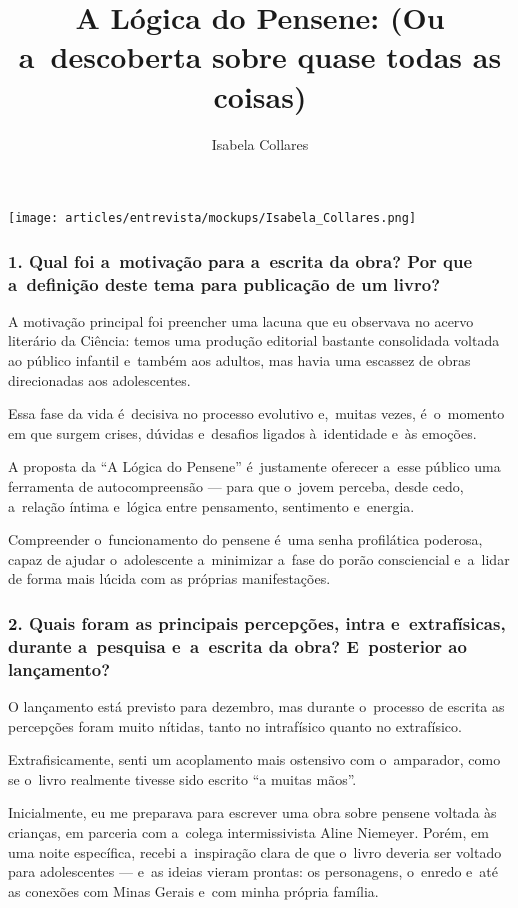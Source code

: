 \documentclass{gescons}
\author{Isabela Collares}
\title{A Lógica do Pensene: (Ou a~descoberta sobre quase todas as coisas)}
\begin{document}
    \makeentrevistatitle

    \begin{multicols}{3}

\begin{center}
    \texttt{[image: articles/entrevista/mockups/Isabela\_Collares.png]}
\end{center}
\vspace{-1cm}


\subsubsection{1. Qual foi a~motivação para a~escrita da obra? Por que a~definição deste tema para publicação de um livro?}

A motivação principal foi preencher uma lacuna que eu observava no acervo literário da Ciência: temos uma produção editorial bastante consolidada voltada ao público infantil e~também aos adultos, mas havia uma escassez de obras direcionadas aos adolescentes.

Essa fase da vida é~decisiva no processo evolutivo e,~muitas vezes, é~o~momento em que surgem crises, dúvidas e~desafios ligados à~identidade e~às emoções.

A proposta da ``A Lógica do Pensene'' é~justamente oferecer a~esse público uma ferramenta de autocompreensão --- para que o~jovem perceba, desde cedo, a~relação íntima e~lógica entre pensamento, sentimento e~energia.

Compreender o~funcionamento do pensene é~uma senha profilática poderosa, capaz de ajudar o~adolescente a~minimizar a~fase do porão consciencial e~a~lidar de forma mais lúcida com as próprias manifestações.


\subsubsection{2. Quais foram as principais percepções, intra e~extrafísicas, durante a~pesquisa e~a~escrita da obra? E~posterior ao lançamento?}

O lançamento está previsto para dezembro, mas durante o~processo de escrita as percepções foram muito nítidas, tanto no intrafísico quanto no extrafísico.

Extrafisicamente, senti um acoplamento mais ostensivo com o~amparador, como se o~livro realmente tivesse sido escrito ``a muitas mãos''.

Inicialmente, eu me preparava para escrever uma obra sobre pensene voltada às crianças, em parceria com a~colega intermissivista Aline Niemeyer. Porém, em uma noite específica, recebi a~inspiração clara de que o~livro deveria ser voltado para adolescentes --- e~as ideias vieram prontas: os personagens, o~enredo e~até as conexões com Minas Gerais e~com minha própria família.


\end{multicols}
\end{document}
